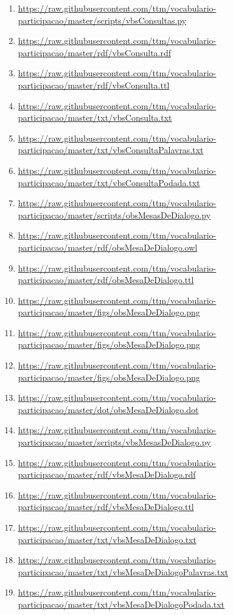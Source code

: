\documentclass[12pt]{article}
\begin{document}
{\begin{enumerate}
\item \url{https://raw.githubusercontent.com/ttm/vocabulario-participacao/master/scripts/vbsConsultas.py}        \label{i:51}
    \item \url{https://raw.githubusercontent.com/ttm/vocabulario-participacao/master/rdf/vbsConsulta.rdf}        \label{i:52}
    \item \url{https://raw.githubusercontent.com/ttm/vocabulario-participacao/master/rdf/vbsConsulta.ttl}        \label{i:53}
    \item \url{https://raw.githubusercontent.com/ttm/vocabulario-participacao/master/txt/vbsConsulta.txt}        \label{i:54}
    \item \url{https://raw.githubusercontent.com/ttm/vocabulario-participacao/master/txt/vbsConsultaPalavras.txt}\label{i:55}
    \item \url{https://raw.githubusercontent.com/ttm/vocabulario-participacao/master/txt/vbsConsultaPodada.txt}  \label{i:56}

 \item \url{https://raw.githubusercontent.com/ttm/vocabulario-participacao/master/scripts/obsMesasDeDialogo.py}\label{i:57}
    \item  \url{https://raw.githubusercontent.com/ttm/vocabulario-participacao/master/rdf/obsMesaDeDialogo.owl}\label{i:58}
    \item  \url{https://raw.githubusercontent.com/ttm/vocabulario-participacao/master/rdf/obsMesaDeDialogo.ttl}\label{i:59}
    \item \url{https://raw.githubusercontent.com/ttm/vocabulario-participacao/master/figs/obsMesaDeDialogo.png}\label{i:60}
    \item \url{https://raw.githubusercontent.com/ttm/vocabulario-participacao/master/figs/obsMesaDeDialogo.png}\label{i:61}
    \item \url{https://raw.githubusercontent.com/ttm/vocabulario-participacao/master/figs/obsMesaDeDialogo.png}\label{i:62}
    \item  \url{https://raw.githubusercontent.com/ttm/vocabulario-participacao/master/dot/obsMesaDeDialogo.dot}\label{i:63}

\item \url{https://raw.githubusercontent.com/ttm/vocabulario-participacao/master/scripts/vbsMesasDeDialogo.py}        \label{i:64}
    \item \url{https://raw.githubusercontent.com/ttm/vocabulario-participacao/master/rdf/vbsMesaDeDialogo.rdf}        \label{i:65}
    \item \url{https://raw.githubusercontent.com/ttm/vocabulario-participacao/master/rdf/vbsMesaDeDialogo.ttl}        \label{i:66}
    \item \url{https://raw.githubusercontent.com/ttm/vocabulario-participacao/master/txt/vbsMesaDeDialogo.txt}        \label{i:67}
    \item \url{https://raw.githubusercontent.com/ttm/vocabulario-participacao/master/txt/vbsMesaDeDialogoPalavras.txt}\label{i:68}
    \item \url{https://raw.githubusercontent.com/ttm/vocabulario-participacao/master/txt/vbsMesaDeDialogoPodada.txt}  \label{i:69}


\end{enumerate}}
\end{document}
